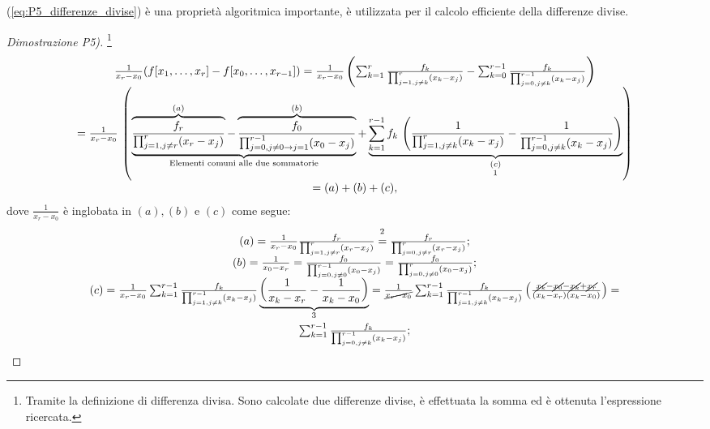 (\ref{eq:P5_differenze_divise}) è  una proprietà algoritmica importante, è utilizzata per il calcolo efficiente della differenze divise.

\begin{proof}[Dimostrazione P5)] \footnote{Tramite la definizione di differenza divisa. Sono calcolate due differenze divise, è effettuata la somma ed è ottenuta l'espressione ricercata.}
    \begin{equation}\label{eq:dimPropDiffDiv}
        \begin{matrix}
            \frac{1}{x_r-x_0}(f[x_1,\hdots, x_r]-f[x_0,\hdots,x_{r-1}]) = \frac{1}{x_r-x_0}\left(\sum_{k=1}^r\frac{f_k}{\prod_{j=1,j\neq k}^r(x_k-x_j)}-\sum_{k=0}^{r-1}\frac{f_k}{\prod_{j=0,j\neq k}^{r-1}(x_k-x_j)}\right)\\
            = \frac{1}{x_r-x_0}\,\left(\underbrace{\overbrace{\frac{f_r}{\prod_{j=1,j\neq r}^r(x_r-x_j)}}^{(a)}-\overbrace{\frac{f_0}{\prod_{j=0,j\neq 0\rightarrow j=1}^{r-1}(x_0-x_j)}}^{(b)}}_{\text{Elementi comuni alle due sommatorie}}+\underbrace{\sum_{k=1}^{r-1}f_k\,\left(\frac{1}{\prod_{j=1,j\neq k}^r(x_k-x_j)}-\frac{1}{\prod_{j=0,j\neq k}^{r-1}(x_k-x_j)}\right)}_{\underset{\footnotemark}{(c)}}\right)\\
             =(a)+(b)+(c),
        \end{matrix}
    \end{equation}
    dove $\frac{1}{x_r-x_0}$ è inglobata in $(a),(b)$ e $(c)$ come segue:
    \begin{equation*} 
        \begin{matrix}
        (a) = \frac{1}{x_r-x_0}\frac{f_r}{\prod_{j=1,j\neq r}^r(x_r-x_j)}\overset{\footnotemark}{=}\frac{f_r}{\prod_{j=0,j\neq r}^r(x_r-x_j)};\\
        (b) = \frac{1}{x_0-x_r}=\frac{f_0}{\prod_{j=0,j\neq 0}^{r-1}(x_0-x_j)}=\frac{f_0}{\prod_{j=0,j\neq 0}^r(x_0-x_j)};\\
        (c) = \frac{1}{x_r-x_0}\sum_{k=1}^{r-1}\frac{f_k}{\prod_{j=1,j\neq k}^{r-1}(x_k-x_j)}\underbrace{\left(\frac{1}{x_k-x_r}-\frac{1}{x_k-x_0}\right)}_{\footnotemark}=
        \frac{1}{\cancel{x_r-x_0}}\sum_{k=1}^{r-1}\frac{f_k}{\prod_{j=1,j\neq k}^{r-1}(x_k-x_j)}\left(\frac{\cancel{x_k}-\cancel{x_0}-\cancel{x_k}+\cancel{x_r}}{(x_k-x_r)(x_k-x_0)}\right)=\\
        \sum_{k=1}^{r-1}\frac{f_k}{\prod_{j=0,j\neq k}^{r-1}(x_k-x_j)};
        \end{matrix}
    \end{equation*}
    \addtocounter{footnote}{-1}
    

\end{proof}
